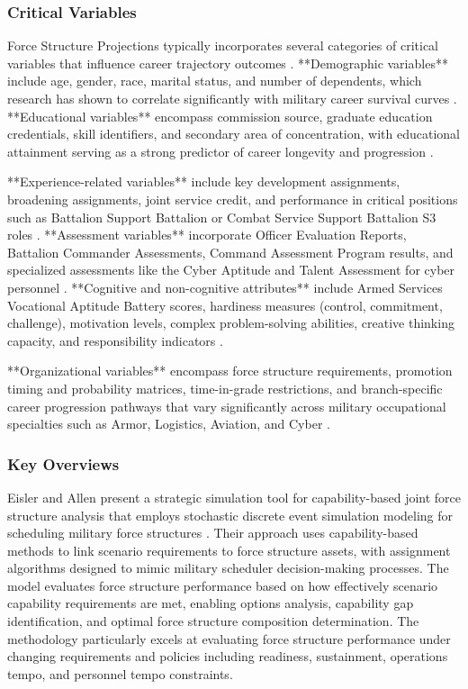\documentclass[main.tex]{subfiles}
\begin{document}
\subsubsection{Critical Variables}

Force Structure Projections typically incorporates several categories of critical variables that influence career trajectory outcomes \parencite{army_indicators}. **Demographic variables** include age, gender, race, marital status, and number of dependents, which research has shown to correlate significantly with military career survival curves \parencite{army_indicators,retention_analysis}. **Educational variables** encompass commission source, graduate education credentials, skill identifiers, and secondary area of concentration, with educational attainment serving as a strong predictor of career longevity and progression \parencite{army_indicators,retention_analysis}.

**Experience-related variables** include key development assignments, broadening assignments, joint service credit, and performance in critical positions such as Battalion Support Battalion or Combat Service Support Battalion S3 roles \parencite{army_indicators}. **Assessment variables** incorporate Officer Evaluation Reports, Battalion Commander Assessments, Command Assessment Program results, and specialized assessments like the Cyber Aptitude and Talent Assessment for cyber personnel \parencite{army_indicators}. **Cognitive and non-cognitive attributes** include Armed Services Vocational Aptitude Battery scores, hardiness measures (control, commitment, challenge), motivation levels, complex problem-solving abilities, creative thinking capacity, and responsibility indicators \parencite{army_indicators}.

**Organizational variables** encompass force structure requirements, promotion timing and probability matrices, time-in-grade restrictions, and branch-specific career progression pathways that vary significantly across military occupational specialties such as Armor, Logistics, Aviation, and Cyber \parencite{army_indicators,manpower_simulation}.

\subsubsection{Key Overviews}

Eisler and Allen present a strategic simulation tool for capability-based joint force structure analysis that employs stochastic discrete event simulation modeling for scheduling military force structures \parencite{eisler_allen}. Their approach uses capability-based methods to link scenario requirements to force structure assets, with assignment algorithms designed to mimic military scheduler decision-making processes. The model evaluates force structure performance based on how effectively scenario capability requirements are met, enabling options analysis, capability gap identification, and optimal force structure composition determination. The methodology particularly excels at evaluating force structure performance under changing requirements and policies including readiness, sustainment, operations tempo, and personnel tempo constraints.
\end{document}
